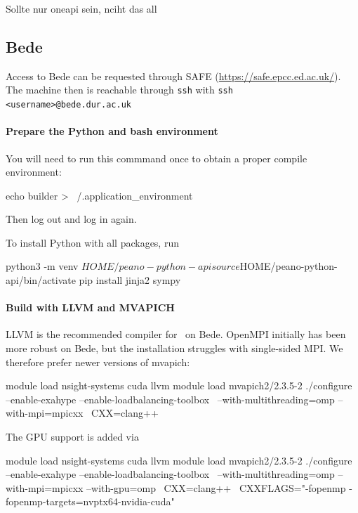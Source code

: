 Sollte nur oneapi sein, nciht das all







\subsection{Bede}


Access to Bede can be requested through SAFE
(\url{https://safe.epcc.ed.ac.uk/}).
The machine then is reachable through \texttt{ssh} with \texttt{ssh
<username>@bede.dur.ac.uk}


\paragraph{Prepare the Python and bash environment}

You will need to run this commmand once to obtain a proper compile environment:
\begin{code}
echo builder > ~/.application_environment
\end{code}
Then log out and log in again.


To install Python with all packages, run
\begin{code}
python3 -m venv $HOME/peano-python-api
source $HOME/peano-python-api/bin/activate
pip install jinja2 sympy
\end{code}


\paragraph{Build with LLVM and MVAPICH}


LLVM is the recommended compiler for \Peano\ on Bede. 
OpenMPI initially has been more robust on Bede, but the installation struggles
with single-sided MPI. 
We therefore prefer newer versions of mvapich:

\begin{code}
module load nsight-systems cuda llvm
module load mvapich2/2.3.5-2 
./configure --enable-exahype --enable-loadbalancing-toolbox \
 --with-multithreading=omp  --with-mpi=mpicxx \
 CXX=clang++
\end{code}

\noindent
The GPU support is added via 
\begin{code}
module load nsight-systems cuda llvm
module load mvapich2/2.3.5-2 
./configure --enable-exahype --enable-loadbalancing-toolbox \
 --with-multithreading=omp  --with-mpi=mpicxx --with-gpu=omp \
 CXX=clang++ \
 CXXFLAGS="-fopenmp -fopenmp-targets=nvptx64-nvidia-cuda"
\end{code}


